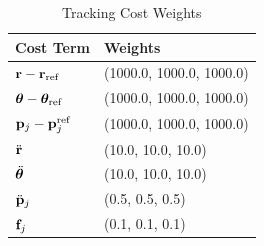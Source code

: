 \begin{table}[t]
\centering
    \caption{Tracking Cost Weights}
    \setlength{\tabcolsep}{4pt}
     \begin{tabular}{ll}
         \hline
         \textbf{Cost Term} & \textbf{Weights}\\\hline
         $\mathbf{r} - \mathbf{r}_{\text{ref}}$ & (1000.0, 1000.0, 1000.0)\\
         $\bm{\theta} - \bm{\theta}_{\text{ref}}$ & (1000.0, 1000.0, 1000.0)\\
         $\mathbf{p}_j - \mathbf{p}_{j}^{\text{ref}}$ & (1000.0, 1000.0, 1000.0)\\
         $\ddot{\mathbf{r}}$ & (10.0, 10.0, 10.0)\\
         $\ddot{\bm{\theta}}$ & (10.0, 10.0, 10.0)\\
         $\ddot{\mathbf{p}}_j$ & (0.5, 0.5, 0.5)\\
         $\mathbf{f}_j$ & (0.1, 0.1, 0.1)\\
         \hline
    \end{tabular}
    \label{tab:cost_weights}
\end{table}
